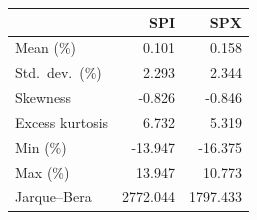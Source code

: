 \begin{tabular}{lrr}
\toprule
 & SPI & SPX \\
\midrule
Mean (\%) & 0.101 & 0.158 \\
Std.\ dev.\ (\%) & 2.293 & 2.344 \\
Skewness & -0.826 & -0.846 \\
Excess kurtosis & 6.732 & 5.319 \\
Min (\%) & -13.947 & -16.375 \\
Max (\%) & 13.947 & 10.773 \\
Jarque--Bera & 2772.044 & 1797.433 \\
\bottomrule
\end{tabular}
